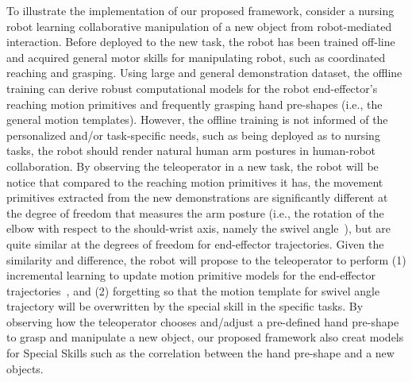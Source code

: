 \documentclass[letterpaper, 11 pt, onecolumn]{article}
\begin{document}

% 

To illustrate the implementation of our proposed framework, consider a nursing robot learning collaborative manipulation of a  new object from robot-mediated interaction. Before deployed to the new task, the robot has been trained off-line and acquired general motor skills for manipulating robot, such as coordinated reaching and grasping. Using large and general demonstration dataset, the offline training can derive robust computational models for the robot end-effector's reaching motion primitives and frequently grasping hand pre-shapes (i.e., the general motion templates). However, the offline training is not informed of the personalized and/or task-specific needs, such as being deployed as to nursing tasks, the robot should render natural human arm postures in human-robot collaboration. By observing the teleoperator in a new task, the robot will be notice that compared to the reaching motion primitives it has, the movement primitives extracted from the new demonstrations are significantly different at the degree of freedom that measures the arm posture (i.e., the rotation of the elbow with respect to the should-wrist axis, namely the swivel angle~\cite{Tolani_Badler:96}), but are quite similar at the degrees of freedom for end-effector trajectories. Given the similarity and difference, the robot will propose to the teleoperator to perform (1) incremental learning to update motion primitive models for the end-effector trajectories~\cite{hewitt2017dmp}, and (2) forgetting so that the motion template for swivel angle trajectory will be overwritten by the special skill in the specific tasks. By observing how the teleoperator chooses and/adjust a pre-defined hand pre-shape to grasp and manipulate a new object, our proposed framework also creat models for Special Skills such as the correlation between the hand pre-shape and a new objects.  
 





\end{document}
